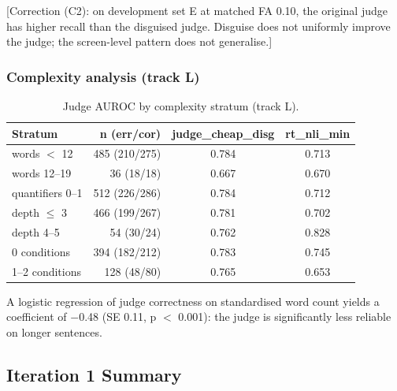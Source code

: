 \documentclass[11pt,letterpaper]{article}
\begin{document}
[Correction (C2): on development set E at matched FA 0.10, the original judge has higher recall than the disguised judge. Disguise does not uniformly improve the judge; the screen-level pattern does not generalise.]

\subsubsection{Complexity analysis (track L)}

\begin{table}[!htbp]
\centering
\caption{Judge AUROC by complexity stratum (track L).}
\label{tab:judge_complexity}
\begin{tabular}{lrcc}
\toprule
Stratum & n (err/cor) & judge\_cheap\_disg & rt\_nli\_min \\
\midrule
words $<$ 12 & 485 (210/275) & 0.784 & 0.713 \\
words 12--19 & 36 (18/18) & 0.667 & 0.670 \\
quantifiers 0--1 & 512 (226/286) & 0.784 & 0.712 \\
depth $\leq$ 3 & 466 (199/267) & 0.781 & 0.702 \\
depth 4--5 & 54 (30/24) & 0.762 & 0.828 \\
0 conditions & 394 (182/212) & 0.783 & 0.745 \\
1--2 conditions & 128 (48/80) & 0.765 & 0.653 \\
\bottomrule
\end{tabular}
\end{table}

A logistic regression of judge correctness on standardised word count yields a coefficient of $-$0.48 (SE 0.11, p $<$ 0.001): the judge is significantly less reliable on longer sentences.

\subsection{Iteration 1 Summary}
\end{document}
